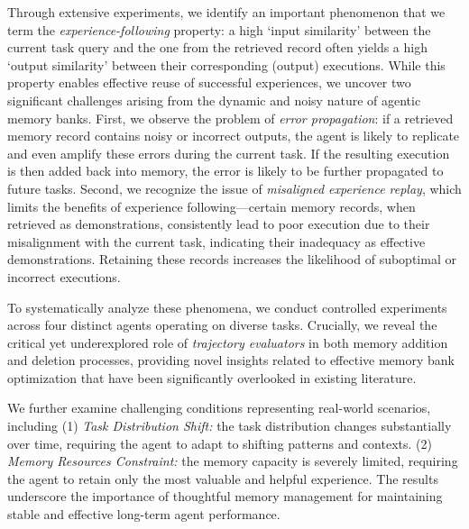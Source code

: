 \documentclass[11pt]{article}
\theoremstyle{plain}
\theoremstyle{definition}
\newcommand{\zhen}[1]{\textcolor{blue}{[Zhen: #1]}}
\begin{document}
% 
Through extensive experiments, we identify an important phenomenon that we term the \textit{experience-following} property: a high `input similarity' between the current task query and the one from the retrieved record often yields a high `output similarity' between their corresponding (output) executions.
{While this property enables effective reuse of successful experiences, we uncover two significant challenges arising from the dynamic and noisy nature of agentic memory banks.}
First, we observe the problem of \textit{error propagation}: if a retrieved memory record contains noisy or incorrect outputs, the agent is likely to replicate and even amplify these errors during the current task. If the resulting execution is then added back into memory, the error is likely to be further propagated to future tasks. 
{Second, we recognize the issue of \textit{misaligned experience replay},
which limits the benefits of experience following—certain memory records, when retrieved as demonstrations, consistently lead to poor execution due to their misalignment with the current task, indicating their inadequacy as effective demonstrations.
Retaining these records increases the likelihood of suboptimal or incorrect executions.}

{To systematically analyze these phenomena, we conduct controlled experiments across four distinct agents operating on diverse tasks. Crucially, we reveal the critical yet underexplored role of \textit{trajectory evaluators} in both memory addition and deletion processes, providing novel insights related to effective memory bank optimization that have been significantly overlooked in existing literature.}

We further examine challenging conditions representing real-world scenarios, including (1) \textit{Task Distribution Shift:} the task distribution changes substantially over time, requiring the agent to adapt to shifting patterns and contexts. (2) \textit{Memory Resources Constraint:} the memory capacity is severely limited, requiring the agent to retain only the most valuable and helpful experience. 
The results underscore the importance of thoughtful memory management for maintaining stable and effective long-term agent performance.
\end{document}
